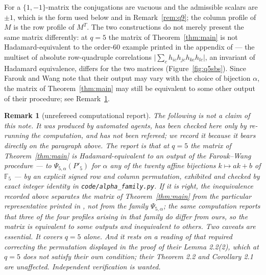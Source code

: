 \documentclass[11pt]{article}
\newtheorem{remark}{Remark}
\newcommand{\F}{\mathbb F}
\begin{document}
For a \(\{1,-1\}\)-matrix the conjugations are vacuous and the admissible
scalars are \(\pm1\), which is the form used below and in
Remark~\ref{rem:q9}; the column profile of \(M\) is the row profile of
\(M^{T}\).  The
two constructions do not merely present the same matrix differently: at
\(q=5\) the matrix of
Theorem~\ref{thm:main} is not Hadamard-equivalent to the order-\(60\)
example printed in the appendix of \cite{FaroukWang2020} --- the
multiset of absolute row-quadruple correlations
\(\bigl|\sum_{c}h_{ic}h_{jc}h_{kc}h_{lc}\bigr|\), an invariant of
Hadamard equivalence, differs for the two matrices
(Figure~\ref{fig:q5sbs}).  Since Farouk and
Wang note that their output may vary with the choice of bijection
\(\alpha\), the matrix of Theorem~\ref{thm:main} may still be equivalent to
some other output of their procedure; see Remark~\ref{rem:alpha5}.

\begin{remark}[unrefereed computational report]\label{rem:alpha5}
The following is \emph{not} a claim of this note.  It was produced by
automated agents, has been checked here only by re-running the computation,
and has not been refereed; we record it because it bears directly on the
paragraph above.  The report is that at \(q=5\) the matrix of
Theorem~\ref{thm:main} \emph{is} Hadamard-equivalent to an output of the
Farouk--Wang procedure --- to \(\Psi_{5,\alpha}(P'_5)\) for \(\alpha\) any of
the twenty affine bijections \(k\mapsto ak+b\) of \(\F_5\) --- by an explicit
signed row and column permutation, exhibited and checked by exact integer
identity in \texttt{code/alpha\_family.py}.  If it is right, the inequivalence
recorded above separates the matrix of Theorem~\ref{thm:main} from the
particular representative printed in \cite{FaroukWang2020}, not from the
family \(\Psi_{5,\alpha}\); the same computation reports that three of the
four profiles arising in that family do differ from ours, so the matrix is
equivalent to some outputs and inequivalent to others.  Two caveats are
essential.  It covers \(q=5\) alone.  And it rests on a reading of
\cite[Steps 4--7]{FaroukWang2020} that required correcting the permutation
displayed in the proof of their Lemma 2.2(2), which at \(q=5\) does not
satisfy their own condition; their Theorem 2.2 and Corollary 2.1 are
unaffected.  Independent verification is wanted.
\end{remark}
\end{document}
